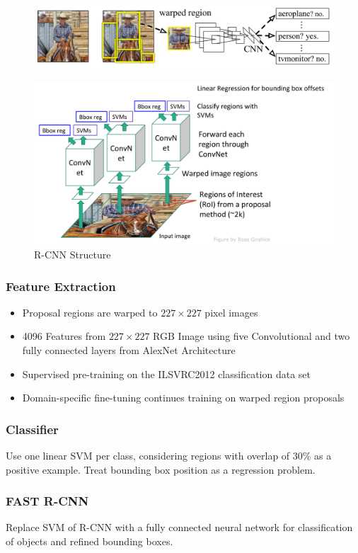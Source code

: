 \begin{figure}[h]
	\centering
	\includegraphics[width=0.7\linewidth]{img/r-cnn}
\end{figure}

\begin{figure}[h]
	\centering
	\includegraphics[width=0.7\linewidth]{img/r-cnn_structure}
	\caption{R-CNN Structure}
\end{figure}

\subsubsection{Feature Extraction}
\begin{itemize}
	\item Proposal regions are warped to $227\times 227$ pixel images
	\item 4096 Features from $227\times 227$ RGB Image using five Convolutional and two fully connected layers from AlexNet Architecture
	\item Supervised pre-training on the ILSVRC2012 classification data set
	\item Domain-specific fine-tuning continues training on warped region proposals
\end{itemize}

\subsubsection{Classifier}
Use one linear SVM per class, considering regions with overlap of 30\% as a positive example. Treat bounding box position as a regression problem.

\subsubsection{FAST R-CNN}
Replace SVM of R-CNN with a fully connected neural network for classification of objects and refined bounding boxes.

